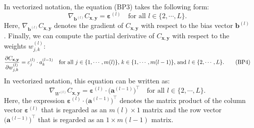 In vectorized notation, the equation (BP3) takes the following form:
\begin{equation}
  \label{eq:BP3v}
  \nabla_{\mathbf{b}^{(l)}} C_{\mathbf{x}, \mathbf{y}} = \boldsymbol{\varepsilon}^{(l)}
  \quad \mbox{for all $l \in \{2, \cdots,L\}$.}
  \tag{BP3v}
\end{equation}
Here, $\nabla_{\mathbf{b}^{(l)}} C_{\mathbf{x}, \mathbf{y}}$ denotes the gradient of $C_{\mathbf{x},
  \mathbf{y}}$ with respect to the bias vector $\mathbf{b}^{(l)}$.
Finally, we can compute the  partial derivative of $C_{\mathbf{x}, \mathbf{y}}$ with respect to the weights $w_{j,k}^{(l)}$:
\begin{equation}
  \label{eq:BP4}
  \frac{\partial C_{\mathbf{x}, \mathbf{y}}}{\partial w_{j,k}^{(l)}} = \varepsilon_j^{(l)} \cdot a_k^{(l-1)} 
  \quad \mbox{for all $j \in \{1,\cdots,m(l)\}$, $ k \in \{1,\cdots,m(l-1)\}$, and $l \in \{2, \cdots,L\}$.}
  \tag{BP4}
\end{equation}
In vectorized notation, this equation can be written as:
\begin{equation}
  \label{eq:BP4v}
  \nabla_{W^{(l)}} C_{\mathbf{x}, \mathbf{y}} = \boldsymbol{\varepsilon}^{(l)} \cdot \bigl(\mathbf{a}^{(l-1)}\bigr)^\top
  \quad \mbox{for all $l \in \{2, \cdots,L\}$.}
  \tag{BP4v}
\end{equation}
Here, the expression $\boldsymbol{\varepsilon}^{(l)} \cdot \bigl(\mathbf{a}^{(l-1)}\bigr)^\top$ denotes the matrix
product of the column vector $\boldsymbol{\varepsilon}^{(l)}$ that is regarded as an $m(l) \times 1$ matrix and the
row vector $\bigl(\mathbf{a}^{(l-1)}\bigr)^\top$ that is regarded as an $1 \times m(l-1)$ matrix.

